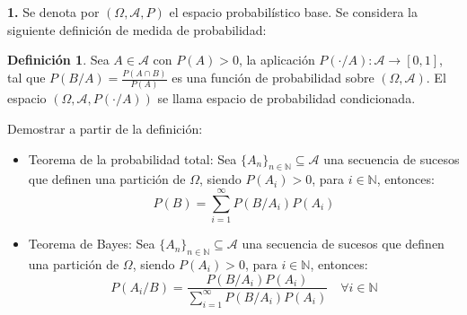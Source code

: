 \documentclass[a4paper, 12pt]{article}
\theoremstyle{plain}
\theoremstyle{definition}
\newtheorem{definicion}[teorema]{Definición}
\theoremstyle{remark}
\begin{document}
	\begin{flushleft}
		\textbf{1.} Se denota por $(\Omega,\mathcal{A},P)$ el espacio probabilístico base. Se considera la siguiente definición de medida de probabilidad:
		\begin{definicion}\label{def}
			Sea $A\in \mathcal{A}$ con $P(A)>0$, la aplicación $P(\cdot /A):\mathcal{A} \longrightarrow \left[0,1\right]$, tal que $P(B/A)=\frac{P(A\cap B)}{P(A)}$ es una función de probabilidad sobre $(\Omega,\mathcal{A})$. El espacio $(\Omega,\mathcal{A},P(\cdot /A))$ se llama espacio de probabilidad condicionada.
		\end{definicion}
		Demostrar a partir de la definición:
		\renewcommand{\theenumi}{\alph{enumi}}
		\begin{itemize}
			\item\label{TPT} Teorema de la probabilidad total: Sea $\{A_n\}_{n\in \mathbb{N}}\subseteq\mathcal{A}$ una secuencia de sucesos que definen una partición de $\Omega$, siendo $P(A_i)>0$, para $i\in \mathbb{N}$, entonces:
				\[P(B)=\sum_{i=1}^{\infty}P(B/A_i)P(A_i)\]
			\item Teorema de Bayes: Sea $\{A_n\}_{n\in \mathbb{N}}\subseteq\mathcal{A}$ una secuencia de sucesos que definen una partición de $\Omega$, siendo $P(A_i)>0$, para $i\in \mathbb{N}$, entonces:
				\[P(A_i/B)=\frac{P(B/A_i)P(A_i)}{\sum_{i=1}^{\infty}P(B/A_i)P(A_i)}\quad \forall i\in \mathbb{N}\]
		\end{itemize}
	\end{flushleft}
	\newpage
\end{document}
